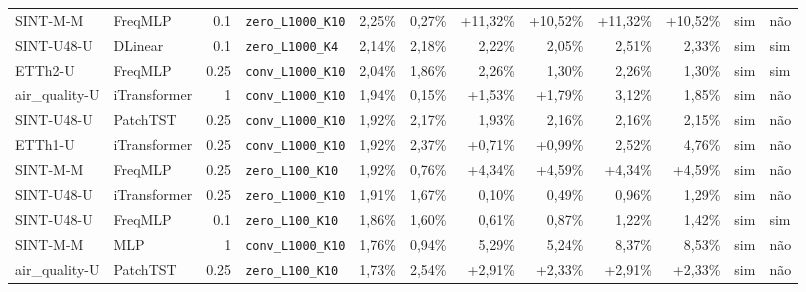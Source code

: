 \begin{longtable}{llrlrrrrrrll}
SINT-M-M & FreqMLP & 0.1 & \texttt{zero\_\allowbreak{}L1000\_\allowbreak{}K10} & \textminus{}2,25\% & \textminus{}0,27\% & +11,32\% & +10,52\% & +11,32\% & +10,52\% & sim & n\~ao \\
SINT-U48-U & DLinear & 0.1 & \texttt{zero\_\allowbreak{}L1000\_\allowbreak{}K4} & \textminus{}2,14\% & \textminus{}2,18\% & \textminus{}2,22\% & \textminus{}2,05\% & \textminus{}2,51\% & \textminus{}2,33\% & sim & sim \\
ETTh2-U & FreqMLP & 0.25 & \texttt{conv\_\allowbreak{}L1000\_\allowbreak{}K10} & \textminus{}2,04\% & \textminus{}1,86\% & \textminus{}2,26\% & \textminus{}1,30\% & \textminus{}2,26\% & \textminus{}1,30\% & sim & sim \\
air\_quality-U & iTransformer & 1 & \texttt{conv\_\allowbreak{}L1000\_\allowbreak{}K10} & \textminus{}1,94\% & \textminus{}0,15\% & +1,53\% & +1,79\% & \textminus{}3,12\% & \textminus{}1,85\% & sim & n\~ao \\
SINT-U48-U & PatchTST & 0.25 & \texttt{conv\_\allowbreak{}L1000\_\allowbreak{}K10} & \textminus{}1,92\% & \textminus{}2,17\% & \textminus{}1,93\% & \textminus{}2,16\% & \textminus{}2,16\% & \textminus{}2,15\% & sim & n\~ao \\
ETTh1-U & iTransformer & 0.25 & \texttt{conv\_\allowbreak{}L1000\_\allowbreak{}K10} & \textminus{}1,92\% & \textminus{}2,37\% & +0,71\% & +0,99\% & \textminus{}2,52\% & \textminus{}4,76\% & sim & n\~ao \\
SINT-M-M & FreqMLP & 0.25 & \texttt{zero\_\allowbreak{}L100\_\allowbreak{}K10} & \textminus{}1,92\% & \textminus{}0,76\% & +4,34\% & +4,59\% & +4,34\% & +4,59\% & sim & n\~ao \\
SINT-U48-U & iTransformer & 0.25 & \texttt{zero\_\allowbreak{}L1000\_\allowbreak{}K10} & \textminus{}1,91\% & \textminus{}1,67\% & \textminus{}0,10\% & \textminus{}0,49\% & \textminus{}0,96\% & \textminus{}1,29\% & sim & n\~ao \\
SINT-U48-U & FreqMLP & 0.1 & \texttt{zero\_\allowbreak{}L100\_\allowbreak{}K10} & \textminus{}1,86\% & \textminus{}1,60\% & \textminus{}0,61\% & \textminus{}0,87\% & \textminus{}1,22\% & \textminus{}1,42\% & sim & sim \\
SINT-M-M & MLP & 1 & \texttt{conv\_\allowbreak{}L1000\_\allowbreak{}K10} & \textminus{}1,76\% & \textminus{}0,94\% & \textminus{}5,29\% & \textminus{}5,24\% & \textminus{}8,37\% & \textminus{}8,53\% & sim & n\~ao \\
air\_quality-U & PatchTST & 0.25 & \texttt{zero\_\allowbreak{}L100\_\allowbreak{}K10} & \textminus{}1,73\% & \textminus{}2,54\% & +2,91\% & +2,33\% & +2,91\% & +2,33\% & sim & n\~ao \\

\end{longtable}
